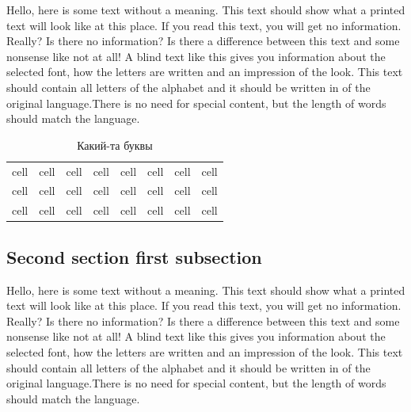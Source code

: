 \documentclass[a4paper,14pt]{extarticle}
\begin{document}
    Hello, here is some text without a meaning.  This text should show what 
    a printed text will look like at this place.  If you read this text, 
    you will get no information.  Really?  Is there no information?  Is there 
    a difference between this text and some nonsense like not at all!  A 
    blind text like this gives you information about the selected font, how 
    the letters are written and an impression of the look.  This text should
    contain all letters of the alphabet and it should be written in of the
    original language.There is no need for special content, but the length of
    words should match the language.

    \begin{table}[H]
            
        \caption{Какий-та буквы}
        \noindent\begin{tabular}{|c|c|c|c|c|c|c|c|}
            \hline
            cell & cell & cell & cell & cell & cell & cell & cell \\
            cell & cell & cell & cell & cell & cell & cell & cell \\
            cell & cell & cell & cell & cell & cell & cell & cell \\
            \hline
            
        \end{tabular}

    \end{table}

    \subsection{Second section first subsection}

    Hello, here is some text without a meaning.  This text should show what 
    a printed text will look like at this place.  If you read this text, 
    you will get no information.  Really?  Is there no information?  Is there 
    a difference between this text and some nonsense like not at all!  A 
    blind text like this gives you information about the selected font, how 
    the letters are written and an impression of the look.  This text should
    contain all letters of the alphabet and it should be written in of the
    original language.There is no need for special content, but the length of
    words should match the language.
\end{document}
